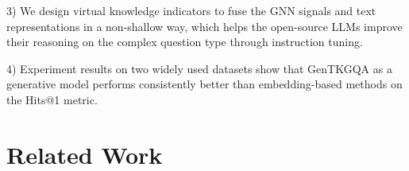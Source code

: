\documentclass[11pt]{article}
\begin{document}
3) We design virtual knowledge indicators to fuse the GNN signals and text representations in a non-shallow way, which helps the open-source LLMs improve their reasoning on the complex question type through instruction tuning.  

4) Experiment results on two widely used datasets show that GenTKGQA as a generative model performs consistently better than embedding-based methods on the Hits@1 metric.

\section{Related Work}
\end{document}
